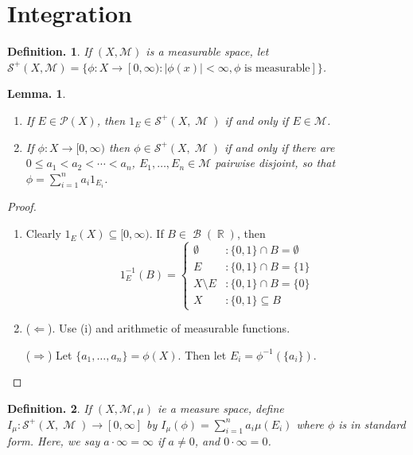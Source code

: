 \documentclass[11pt, a4paper]{memoir}
\DeclareMathOperator{\R}{{\mathbb{R}}}
\theoremstyle{change}
\newtheorem{lemma}[theorem]{Lemma.}
\theoremstyle{plain}
\theoremstyle{nonumberplain}
\newtheorem{definition}{Definition.}
\newtheorem{proof}{Proof}
\DeclareMathOperator{\M}{{\mathcal{M}}}
\DeclareMathOperator{\B}{{\mathcal{B}}}
\begin{document}
\section{Integration}
\begin{definition}
    If $(X,\mathcal{M})$ is a measurable space, let $\mathcal{S}^+(X,\mathcal{M})=\{\phi:X\to[0,\infty):|\phi(x)|<\infty,\phi\text{ is measurable}]\}$.
\end{definition}
\begin{lemma}
    \begin{enumerate}[nolistsep, label=(\roman*)]
        \item If $E\in\mathcal{P}(X)$, then $1_E\in\mathcal{S}^+(X,\M)$ if and only if $E\in\mathcal{M}$. %
        \item If $\phi:X\to[0,\infty)$ then $\phi\in\mathcal{S}^+(X,\M)$ if and only if there are $0\leq a_1<a_2<\cdots<a_n$, $E_1,\ldots,E_n\in\mathcal{M}$ pairwise disjoint, so that $\phi=\sum_{i=1}^n a_i 1_{E_i}$.
    \end{enumerate}
\end{lemma}
\begin{proof}
    \begin{enumerate}[nolistsep, label=(\roman*)]
        \item Clearly $1_E(X)\subseteq[0,\infty)$. %
            If $B\in\B(\R)$, then
            \begin{equation*}
                1_E^{-1}(B)=\begin{cases}
                    \emptyset&:\{0,1\}\cap B=\emptyset\\
                    E&:\{0,1\}\cap B=\{1\}\\
                    X\setminus E&:\{0,1\}\cap B=\{0\}\\
                    X&:\{0,1\}\subseteq B
                \end{cases}
            \end{equation*}
        \item ($\Leftarrow$).
            Use (i) and arithmetic of measurable functions.

            ($\Rightarrow$) Let $\{a_1,\ldots,a_n\}=\phi(X)$.
            Then let $E_i=\phi^{-1}(\{a_i\})$.
    \end{enumerate}
\end{proof}
\begin{definition}
    If $(X,\mathcal{M},\mu)$ ie a measure space, define $I_\mu:\mathcal{S}^+(X,\M)\to[0,\infty]$ by $I_\mu(\phi)=\sum_{i=1}^n a_i\mu(E_i)$ where $\phi$ is in standard form.
    Here, we say $a\cdot\infty=\infty$ if $a\neq 0$, and $0\cdot\infty=0$.
\end{definition}
\end{document}
